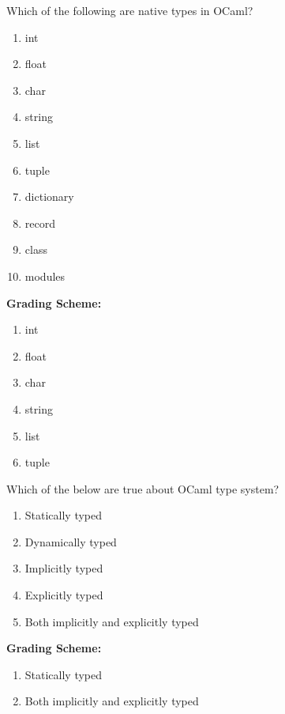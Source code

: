 \documentclass[addpoints,11pt]{exam}
\newcommand{\grade}[1]{{\color{red}\textbf{Grading Scheme:} #1}}
\begin{document}
\begin{questions}
\question Which of the following are native types in OCaml?
\begin{enumerate}
\item int
\item float
\item char
\item string
\item list
\item tuple
\item dictionary
\item record
\item class
\item modules
\end{enumerate}
\begin{solution}
\grade{
\begin{enumerate}
\item int
\item float
\item char
\item string
\item list
\item tuple
\end{enumerate}
}
\end{solution}

\question Which of the below are true about OCaml type system?
\begin{enumerate}
  \item Statically typed
  \item Dynamically typed
  \item Implicitly typed
  \item Explicitly typed
  \item Both implicitly and explicitly typed
\end{enumerate} 
\begin{solution}
\grade{
\begin{enumerate}
  \item Statically typed
  \item Both implicitly and explicitly typed
\end{enumerate} 
}
\end{solution}


\end{questions}
\end{document}
